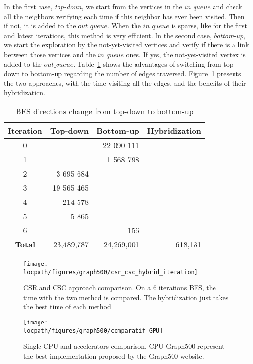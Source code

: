 In the first case, \textit{top-down}, we start from the vertices in the $in\_queue$ and check all the neighbors verifying each time if this neighbor has ever been visited. 
Then if not, it is added to the $out\_queue$. 
When the $in\_queue$ is sparse, like for the first and latest iterations, this method is very efficient. 
In the second case, \textit{bottom-up}, we start the exploration by the not-yet-visited vertices and verify if there is a link between those vertices and the $in\_queue$ ones. 
If yes, the not-yet-visited vertex is added to the $out\_queue$. 
Table~\ref{table:direction_optimized} shows the advantages of switching from top-down to bottom-up regarding the number of edges traversed.
Figure~\ref{fig:csr_csc} presents the two approaches, with the time visiting all the edges, and the benefits of their hybridization.

\begin{table}[t!]
\centering
\begin{tabular}{c||r|r|r}
		\textbf{Iteration} & \textbf{Top-down} & \textbf{Bottom-up} & \textbf{Hybridization} \\ 
		\hline 
		\hline 
		0 & \color{red}{27} & 22 090 111 & \color{red}{27} \\ 
		1 & \color{red}{8 156} & 1 568 798 & \color{red}{8 156} \\ 
		\hline 
		2 & 3 695 684 & \color{blue}{587 893} & \color{blue}{587 893} \\ 
		3 & 19 565 465 & \color{blue}{12 586} & \color{blue}{12 586} \\ 
		4 & 214 578 & \color{blue}{8 256} & \color{blue}{8 256} \\ 
		5 & 5 865 & \color{blue}{1 201} & \color{blue}{1 201} \\ 
		\hline 
		6 & \color{red}{12} & 156 & \color{red}{12} \\ 
		\hline
		\textbf{Total} & 23,489,787 & 24,269,001 & 618,131 
\end{tabular} 
\caption{BFS directions change from top-down to bottom-up}	
\label{table:direction_optimized}
\end{table}

\begin{figure}[t]
	\centering
	\texttt{[image: \\locpath/figures/graph500/csr\_csc\_hybrid\_iteration]}
	\caption[Comparison of CSR and CSC approaches]{CSR and CSC approach comparison. On a 6 iterations BFS, the time with the two method is compared. The hybridization just takes the best time of each method}
	\label{fig:csr_csc}
\end{figure}
\hfill
\begin{figure}[t]
	\centering
	\texttt{[image: \\locpath/figures/graph500/comparatif\_GPU]}
	\caption[CPU versus GPU comparison on one node]{Single CPU and accelerators comparison. CPU Graph500 represent the best implementation proposed by the Graph500 website.}
	\label{fig:single_cpu_accelerators}
\end{figure}

